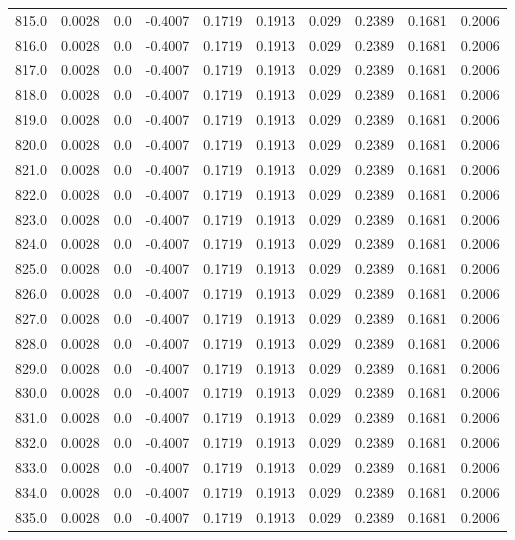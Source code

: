 \begin{longtable}{lrrrrrrrrr}
815.0 & 0.0028 & 0.0 & -0.4007 & 0.1719 & 0.1913 & 0.029 & 0.2389 & 0.1681 & 0.2006 \\
816.0 & 0.0028 & 0.0 & -0.4007 & 0.1719 & 0.1913 & 0.029 & 0.2389 & 0.1681 & 0.2006 \\
817.0 & 0.0028 & 0.0 & -0.4007 & 0.1719 & 0.1913 & 0.029 & 0.2389 & 0.1681 & 0.2006 \\
818.0 & 0.0028 & 0.0 & -0.4007 & 0.1719 & 0.1913 & 0.029 & 0.2389 & 0.1681 & 0.2006 \\
819.0 & 0.0028 & 0.0 & -0.4007 & 0.1719 & 0.1913 & 0.029 & 0.2389 & 0.1681 & 0.2006 \\
820.0 & 0.0028 & 0.0 & -0.4007 & 0.1719 & 0.1913 & 0.029 & 0.2389 & 0.1681 & 0.2006 \\
821.0 & 0.0028 & 0.0 & -0.4007 & 0.1719 & 0.1913 & 0.029 & 0.2389 & 0.1681 & 0.2006 \\
822.0 & 0.0028 & 0.0 & -0.4007 & 0.1719 & 0.1913 & 0.029 & 0.2389 & 0.1681 & 0.2006 \\
823.0 & 0.0028 & 0.0 & -0.4007 & 0.1719 & 0.1913 & 0.029 & 0.2389 & 0.1681 & 0.2006 \\
824.0 & 0.0028 & 0.0 & -0.4007 & 0.1719 & 0.1913 & 0.029 & 0.2389 & 0.1681 & 0.2006 \\
825.0 & 0.0028 & 0.0 & -0.4007 & 0.1719 & 0.1913 & 0.029 & 0.2389 & 0.1681 & 0.2006 \\
826.0 & 0.0028 & 0.0 & -0.4007 & 0.1719 & 0.1913 & 0.029 & 0.2389 & 0.1681 & 0.2006 \\
827.0 & 0.0028 & 0.0 & -0.4007 & 0.1719 & 0.1913 & 0.029 & 0.2389 & 0.1681 & 0.2006 \\
828.0 & 0.0028 & 0.0 & -0.4007 & 0.1719 & 0.1913 & 0.029 & 0.2389 & 0.1681 & 0.2006 \\
829.0 & 0.0028 & 0.0 & -0.4007 & 0.1719 & 0.1913 & 0.029 & 0.2389 & 0.1681 & 0.2006 \\
830.0 & 0.0028 & 0.0 & -0.4007 & 0.1719 & 0.1913 & 0.029 & 0.2389 & 0.1681 & 0.2006 \\
831.0 & 0.0028 & 0.0 & -0.4007 & 0.1719 & 0.1913 & 0.029 & 0.2389 & 0.1681 & 0.2006 \\
832.0 & 0.0028 & 0.0 & -0.4007 & 0.1719 & 0.1913 & 0.029 & 0.2389 & 0.1681 & 0.2006 \\
833.0 & 0.0028 & 0.0 & -0.4007 & 0.1719 & 0.1913 & 0.029 & 0.2389 & 0.1681 & 0.2006 \\
834.0 & 0.0028 & 0.0 & -0.4007 & 0.1719 & 0.1913 & 0.029 & 0.2389 & 0.1681 & 0.2006 \\
835.0 & 0.0028 & 0.0 & -0.4007 & 0.1719 & 0.1913 & 0.029 & 0.2389 & 0.1681 & 0.2006 \\

\end{longtable}
